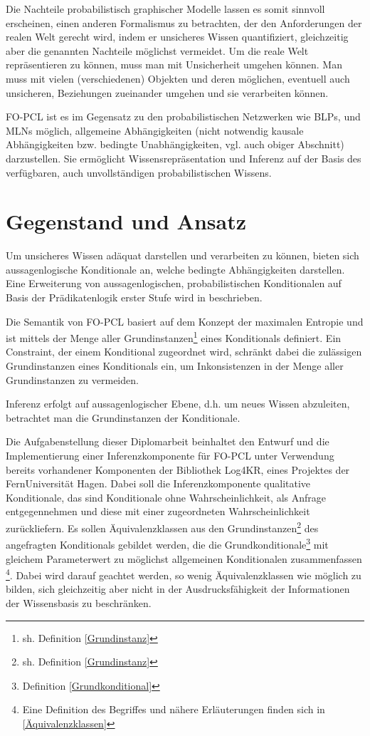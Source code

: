 \documentclass[a4paper, 11pt]{book}
\begin{document}
Die Nachteile probabilistisch graphischer Modelle lassen es somit sinnvoll erscheinen, einen anderen Formalismus zu betrachten, der den Anforderungen der realen Welt  gerecht wird, indem er unsicheres Wissen quantifiziert, gleichzeitig aber die genannten Nachteile möglichst vermeidet. Um die reale Welt repräsentieren zu können, muss man mit Unsicherheit umgehen können. Man muss mit vielen (verschiedenen) Objekten und deren möglichen, eventuell auch unsicheren,  Beziehungen zueinander umgehen und sie verarbeiten können.

FO-PCL ist es im Gegensatz zu den probabilistischen Netzwerken wie BLPs, und MLNs möglich, allgemeine Abhängigkeiten (nicht notwendig kausale Abhängigkeiten bzw. bedingte Unabhängigkeiten, vgl. auch obiger Abschnitt) darzustellen. Sie ermöglicht Wissensrepräsentation und Inferenz auf der Basis des verfügbaren, auch unvollständigen probabilistischen Wissens. 


\section{Gegenstand und Ansatz}
Um unsicheres Wissen adäquat darstellen und verarbeiten zu können, bieten sich aussagenlogische Konditionale  an, welche bedingte Abhängigkeiten darstellen. Eine Erweiterung von aussagenlogischen, probabilistischen Konditionalen auf Basis der Prädikatenlogik erster Stufe wird in \cite[Kap. 6]{Fis10} beschrieben.

 Die Semantik von FO-PCL basiert auf dem Konzept der maximalen Entropie und ist mittels der Menge aller Grundinstanzen\footnote{sh. Definition \ref{Grundinstanz}} eines Konditionals definiert. Ein Constraint, der einem Konditional zugeordnet wird, schränkt dabei die zulässigen Grundinstanzen eines Konditionals ein, um Inkonsistenzen in der Menge aller Grundinstanzen zu vermeiden.
 
Inferenz erfolgt auf aussagenlogischer Ebene, d.h. um neues Wissen abzuleiten, betrachtet man die Grundinstanzen der Konditionale.


Die Aufgabenstellung dieser Diplomarbeit beinhaltet den Entwurf und die Implementierung einer Inferenzkomponente für FO-PCL unter Verwendung bereits vorhandener Komponenten der Bibliothek Log4KR, eines Projektes der FernUniversität Hagen. Dabei soll die Inferenzkomponente qualitative Konditionale, das sind Konditionale ohne Wahrscheinlichkeit, als Anfrage entgegennehmen und diese mit einer zugeordneten Wahrscheinlichkeit zurückliefern. Es sollen Äquivalenzklassen   aus den Grundinstanzen\footnote{sh. Definition \ref{Grundinstanz}}  des angefragten Konditionals gebildet werden, die die Grundkonditionale\footnote{Definition \ref{Grundkonditional}} mit gleichem Parameterwert zu möglichst allgemeinen Konditionalen zusammenfassen \footnote{Eine Definition des Begriffes und nähere Erläuterungen finden sich in \ref{Äquivalenzklassen}}. Dabei wird darauf geachtet werden, so wenig Äquivalenzklassen wie möglich zu bilden, sich gleichzeitig aber nicht in der Ausdrucksfähigkeit der Informationen der Wissensbasis zu beschränken.
\end{document}
